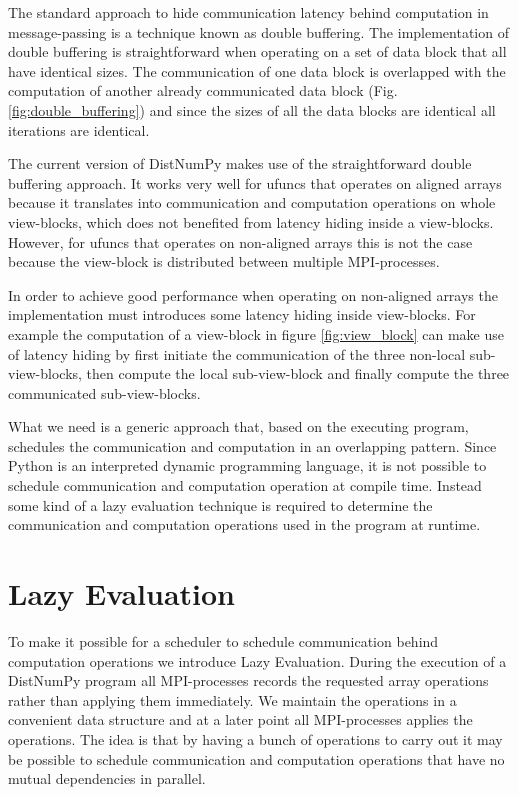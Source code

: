 \documentclass[preprint]{../PGAS10/sigplanconf}
\begin{document}
The standard approach to hide communication latency behind computation in message-passing is a technique known as double buffering. The implementation of double buffering is straightforward when operating on a set of data block that all have identical sizes. The communication of one data block is overlapped with the computation of another already communicated data block (Fig. \ref{fig:double_buffering}) and since the sizes of all the data blocks are identical all iterations are identical.

The current version of DistNumPy makes use of the straightforward double buffering approach. It works very well for ufuncs that operates on aligned arrays because it translates into communication and computation operations on whole view-blocks, which does not benefited from latency hiding inside a view-blocks. However, for ufuncs that operates on non-aligned arrays this is not the case because the view-block is distributed between multiple MPI-processes. 

In order to achieve good performance when operating on non-aligned arrays the implementation must introduces some latency hiding inside view-blocks. For example the computation of a view-block in figure \ref{fig:view_block} can make use of latency hiding by first initiate the communication of the three non-local sub-view-blocks, then compute the local sub-view-block and finally compute the three communicated sub-view-blocks. 

What we need is a generic approach that, based on the executing program, schedules the communication and computation in an overlapping pattern. Since Python is an interpreted dynamic programming language, it is not possible to schedule communication and computation operation at compile time. Instead some kind of a lazy evaluation technique is required to determine the communication and computation operations used in the program at runtime.


\section{Lazy Evaluation}
To make it possible for a scheduler to schedule communication behind computation operations we introduce Lazy Evaluation. During the execution of a DistNumPy program all MPI-processes records the requested array operations rather than applying them immediately. We maintain the operations in a convenient data structure and at a later point all MPI-processes applies the operations. The idea is that by having a bunch of operations to carry out it may be possible to schedule communication and computation operations that have no mutual dependencies in parallel.
\end{document}
